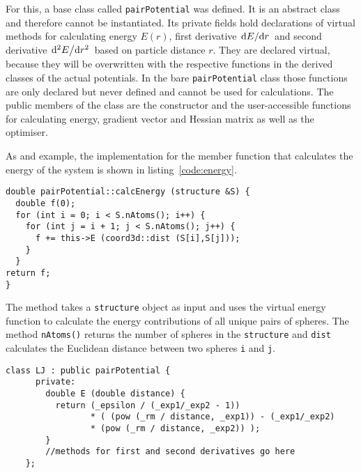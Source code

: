 For this, a base class called \verb|pairPotential| was defined. It is an
abstract class and therefore cannot be instantiated. Its private fields hold
declarations of virtual methods for calculating energy $E(r)$, first derivative
$\dv*{E}{r}$ and second derivative $\dv*[2]{E}{r}$ based on particle distance
$r$. They are declared virtual, because they will be overwritten with the
respective functions in the derived classes of the actual potentials. In the
bare \verb|pairPotential| class those functions are only declared but never
defined and cannot be used for calculations. The public members of the class are
the constructor and the user-accessible functions for calculating energy,
gradient vector and Hessian matrix as well as the optimiser.

As and example, the \Cpp implementation for the member function that calculates
the energy of the system is shown in listing~\ref{code:energy}.
%
\begin{lstlisting}[caption={Implementation of the redundant part of the energy calculation.},label=code:energy,float=htb]
double pairPotential::calcEnergy (structure &S) {
  double f(0);
  for (int i = 0; i < S.nAtoms(); i++) {
    for (int j = i + 1; j < S.nAtoms(); j++) {
      f += this->E (coord3d::dist (S[i],S[j]));
    }
  }
return f;
}
\end{lstlisting}
%
The method takes a \verb|structure| object as input and uses the virtual energy
function to calculate the energy contributions of all unique pairs of spheres.
The method \texttt{nAtoms()} returns the number of spheres in the
\texttt{structure} and \texttt{dist} calculates the Euclidean distance between
two spheres \texttt{i} and \texttt{j}.

\begin{lstlisting}[caption={Implementation of the distance dependant energy for the Lennard-Jones potential.},label=code:LJenergy,float=htb]
    class LJ : public pairPotential {
      private:
        double E (double distance) {
          return (_epsilon / (_exp1/_exp2 - 1)) 
                 * ( (pow (_rm / distance, _exp1)) - (_exp1/_exp2) 
                 * (pow (_rm / distance, _exp2)) );
        }
        //methods for first and second derivatives go here
    };
\end{lstlisting}

